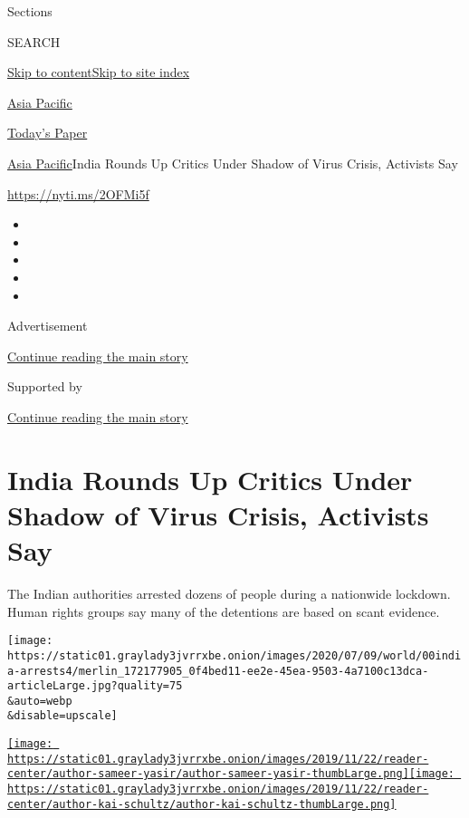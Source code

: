 Sections

SEARCH

\protect\hyperlink{site-content}{Skip to
content}\protect\hyperlink{site-index}{Skip to site index}

\href{https://www.nytimes3xbfgragh.onion/section/world/asia}{Asia
Pacific}

\href{https://myaccount.nytimes3xbfgragh.onion/auth/login?response_type=cookie\&client_id=vi}{}

\href{https://www.nytimes3xbfgragh.onion/section/todayspaper}{Today's
Paper}

\href{/section/world/asia}{Asia Pacific}\textbar{}India Rounds Up
Critics Under Shadow of Virus Crisis, Activists Say

\url{https://nyti.ms/2OFMi5f}

\begin{itemize}
\item
\item
\item
\item
\item
\end{itemize}

Advertisement

\protect\hyperlink{after-top}{Continue reading the main story}

Supported by

\protect\hyperlink{after-sponsor}{Continue reading the main story}

\hypertarget{india-rounds-up-critics-under-shadow-of-virus-crisis-activists-say}{%
\section{India Rounds Up Critics Under Shadow of Virus Crisis, Activists
Say}\label{india-rounds-up-critics-under-shadow-of-virus-crisis-activists-say}}

The Indian authorities arrested dozens of people during a nationwide
lockdown. Human rights groups say many of the detentions are based on
scant evidence.

\texttt{[image: https://static01.graylady3jvrrxbe.onion/images/2020/07/09/world/00india-arrests4/merlin\_172177905\_0f4bed11-ee2e-45ea-9503-4a7100c13dca-articleLarge.jpg?quality=75\\\&auto=webp\\\&disable=upscale]}

\href{https://www.nytimes3xbfgragh.onion/by/sameer-yasir}{\texttt{[image: https://static01.graylady3jvrrxbe.onion/images/2019/11/22/reader-center/author-sameer-yasir/author-sameer-yasir-thumbLarge.png]}}\href{https://www.nytimes3xbfgragh.onion/by/kai-schultz}{\texttt{[image: https://static01.graylady3jvrrxbe.onion/images/2019/11/22/reader-center/author-kai-schultz/author-kai-schultz-thumbLarge.png]}}

